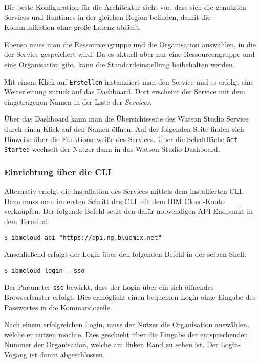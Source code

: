 Die beste Konfiguration für die Architektur sieht vor, dass sich die genutzten Services und Runtimes in der gleichen
Region befinden, damit die Kommunikation ohne große Latenz abläuft.

Ebenso muss man die Ressourcengruppe und die Organisation auswählen, in die der Service gespeichert wird. Da es aktuell
aber nur eine Ressourcengruppe und eine Organisation gibt, kann die Standardeinstellung beibehalten werden.

Mit einem Klick auf \texttt{Erstellen} instanziiert man den Service und es erfolgt eine Weiterleitung zurück auf das
Dashboard. Dort erscheint der Service mit dem eingetragenen Namen in der Liste der \textit{Services}.

Über das Dashboard kann man die Übersichtsseite des Watson Studio Service durch einen Klick auf den Namen öffnen. Auf
der folgenden Seite finden sich Hinweise über die Funktionsnweiße des Services. Über die Schaltfläche
\texttt{Get Started} wechselt der Nutzer dann in das Watson Studio Dashboard.

\subsubsection{Einrichtung über die CLI}
Alternativ erfolgt die Installation des Services mittels dem installierten CLI. Dazu muss man im ersten Schritt das CLI
mit dem IBM Cloud-Konto verknüpfen. Der folgende Befehl setzt den dafür notwendigen API-Endpunkt in dem Terminal:

\begin{lstlisting}[caption=Setzen des API-Endpunktes, label=ls:vorbereitung_apiendpunkt]
    $ ibmcloud api "https://api.ng.bluemix.net"
\end{lstlisting}

Anschließend erfolgt der Login über den folgenden Befehl in der selben Shell:

\begin{lstlisting}[caption=Login über CLI und Single Sign-on, label=ls:vorbereitung_login]
    $ ibmcloud login --sso
\end{lstlisting}

Der Parameter \texttt{sso} bewirkt, dass der Login über ein sich öffnendes Browserfenster erfolgt. Dies ermöglicht einen
bequemen Login ohne Eingabe des Passwortes in die Kommandozeile.

Nach einem erfolgreichen Login, muss der Nutzer die Organisation auswählen, welche er nutzen möchte. Dies geschieht über
die Eingabe der entsprechenden Nummer der Organisation, welche am linken Rand zu sehen ist. Der Login-Vogang ist damit
abgeschlossen.


